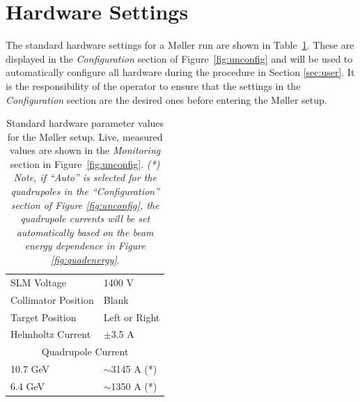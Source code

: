 \documentclass[amsmath,amssymb,notitlepage,12pt]{revtex4}
\begin{document}
\newpage

\section{Hardware Settings}
The standard hardware settings for a M{\o}ller run are shown in Table~\ref{tab:pars}.  These are displayed in the {\em Configuration} section of Figure~\ref{fig:unconfig} and will be used to automatically configure all hardware during the procedure in Section \ref{sec:user}.  It is the responsibility of the operator to ensure that the settings in the {\em Configuration} section are the desired ones before entering the M{\o}ller setup.
\begin{table}[htbp]\centering
    \begin{tabular}{ll}\toprule[1.5pt]
        SLM Voltage & 1400 V \\
        Collimator Position & Blank \\
        Target Position & Left or Right \\
        Helmholtz Current & $\pm$3.5 A \\
        \cmidrule[0.5pt]{1-2}
        \multicolumn{2}{c}{Quadrupole Current} \\
        10.7 GeV & $\sim$3145 A (*)\\
        6.4 GeV & $\sim$1350 A (*)\\
        \bottomrule[1.5pt]
    \end{tabular}
    \caption{Standard hardware parameter values for the M{\o}ller setup.  Live, measured values are shown in the {\em Monitoring} section in Figure~\ref{fig:unconfig}. {\em (*) Note, if ``Auto'' is selected for the quadrupoles in the ``Configuration'' section of Figure \ref{fig:unconfig}, the quadrupole currents will be set automatically based on the beam energy dependence in Figure \ref{fig:quadenergy}}.\label{tab:pars}}
\end{table}
\end{document}
